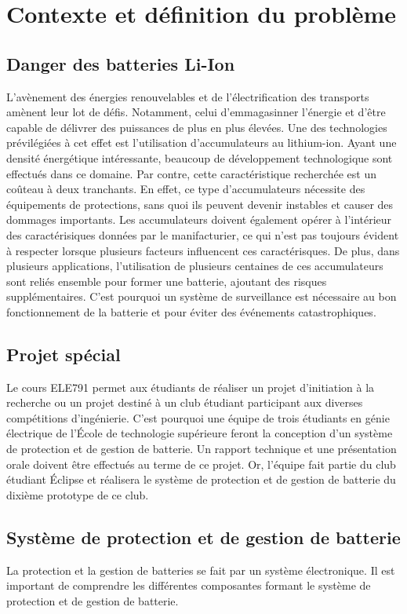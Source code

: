 \section{Contexte et définition du problème}


	\subsection{Danger des batteries Li-Ion}
		L'avènement des énergies renouvelables et de l'électrification des transports amènent leur lot de défis. Notamment, celui d'emmagasinner l'énergie et d'être capable de délivrer des puissances de plus en plus élevées. Une des technologies prévilégiées à cet effet est l'utilisation d'accumulateurs au lithium-ion. Ayant une densité énergétique intéressante, beaucoup de développement technologique sont effectués dans ce domaine. Par contre, cette caractéristique recherchée est un coûteau à deux tranchants. En effet, ce type d'accumulateurs nécessite des équipements de protections, sans quoi ils peuvent devenir instables et causer des dommages importants. Les accumulateurs doivent également opérer à l'intérieur des caractérisiques données par le manifacturier, ce qui n'est pas toujours évident à respecter lorsque plusieurs facteurs influencent ces caractérisques. De plus, dans plusieurs applications, l'utilisation de plusieurs centaines de ces accumulateurs sont reliés ensemble pour former une batterie, ajoutant des risques supplémentaires. C'est pourquoi un système de surveillance est nécessaire au bon fonctionnement de la batterie et pour éviter des événements catastrophiques.


	\subsection{Projet spécial}
		Le cours ELE791 permet aux étudiants de réaliser un projet d'initiation à la recherche ou un projet destiné à un club étudiant participant aux diverses compétitions d'ingénierie. C'est pourquoi une équipe de trois étudiants en génie électrique de l'École de technologie supérieure feront la conception d'un système de protection et de gestion de batterie. Un rapport technique et une présentation orale doivent être effectués au terme de ce projet. Or, l'équipe fait partie du club étudiant Éclipse et réalisera le système de protection et de gestion de batterie du dixième prototype de ce club.
			
	\subsection{Système de protection et de gestion de batterie}
		La protection et la gestion de batteries se fait par un système électronique. Il est important de comprendre les différentes composantes formant le système de protection et de gestion de batterie.
	
